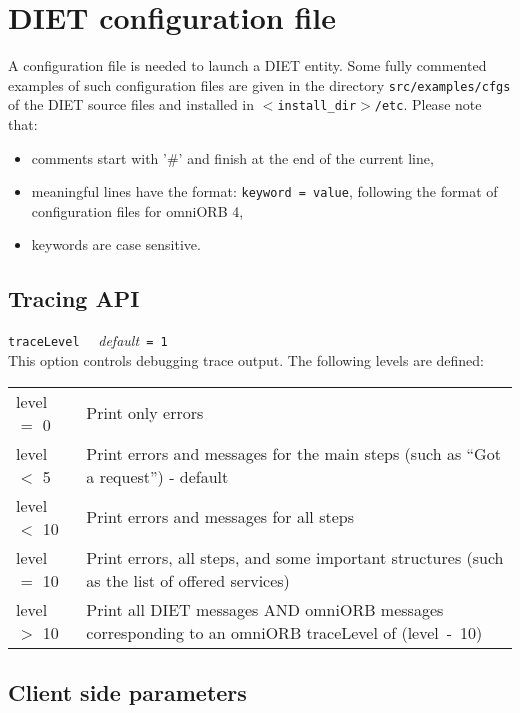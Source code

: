 \section{DIET configuration file} 

A configuration file is needed to launch a DIET entity. Some fully
commented examples of such configuration files are given in the
directory \texttt{src/examples/cfgs} of the DIET source files and
installed in \texttt{$<$install\_dir$>$/etc}. Please note that:
\begin{itemize}
\item comments start with '\#' and finish at the end of the current
  line,
\item meaningful lines have the format: \texttt{keyword = value}, following the
  format of configuration files for omniORB 4,
\item keywords are case sensitive.
\end{itemize}

\subsection{Tracing API}

\noindent
\texttt{traceLevel} \ \ \emph{default}\texttt{ = 1}\\
This option controls debugging trace output. The following levels are defined:

\begin{center}
 \footnotesize
 \begin{tabular}{p{.1\linewidth}p{.8\linewidth}}
  level $=$ 0  & Print only errors\\
  level $<$ 5  & Print errors and messages for the main steps (such as ``Got a
  request'') - default\\
  level $<$ 10 & Print errors and messages for all steps\\
  level $=$ 10 & Print errors, all steps, and some important structures (such
  as the list of offered services)\\
  level $>$ 10 & Print all DIET messages AND omniORB messages corresponding to
  an omniORB traceLevel of (level~-~10)
 \end{tabular}
\end{center}


\subsection{Client side parameters}

